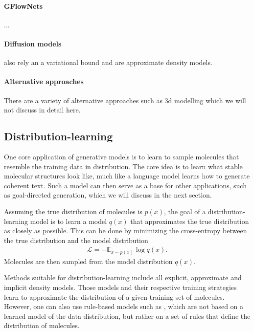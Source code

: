 \paragraph{GFlowNets} ...

\paragraph{Diffusion models} also rely an a variational bound and are approximate
density models.

\paragraph{Alternative approaches} There are a variety of alternative approaches
such as 3d modelling which we will not discuss in detail here.
    


\subsection{Distribution-learning}
One core application of generative models is to learn to sample molecules that
resemble the training data in distribution. The core idea is to learn what
stable molecular structures look like, much like a language model learns how to
generate coherent text. Such a model can then serve as a base for other
applications, such as goal-directed generation, which we will discuss in the next
section.

Assuming the true distribution of molecules is $p(x)$, the goal of a
distribution-learning model is to learn a model $q(x)$ that approximates the
true distribution as closely as possible. This can be done by minimizing the
cross-entropy between the true distribution and the model distribution
\begin{align}
    \mathcal{L} = - \mathbb{E}_{x \sim p(x)} \log q(x).
\end{align}
Molecules are then sampled from the model distribution $q(x)$. 

Methods suitable for distribution-learning include all explicit, approximate and 
implicit density models. Those models and their respective training strategies
learn to approximate the distribution of a given training set of molecules.
However, one can also use rule-based models such as \citep{jensenGraphbasedGeneticAlgorithm2019}, which are not based on a learned
model of the data distribution, but rather on a set of rules that define the
distribution of molecules.

